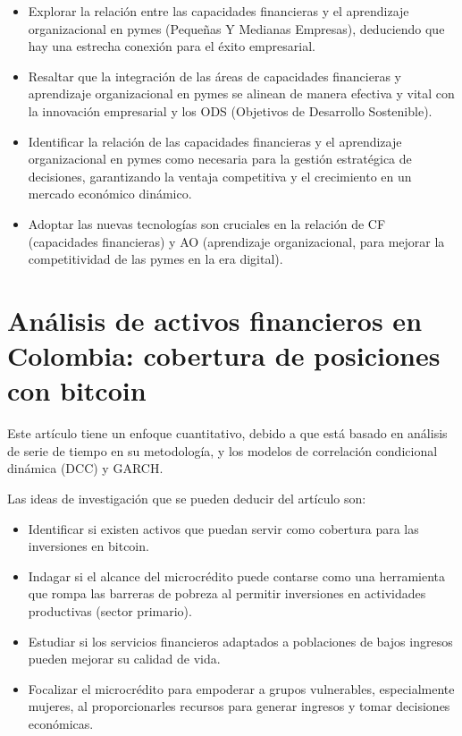 \documentclass[letterpaper, 12pt]{report}
\begin{document}
\begin{itemize}
      \item Explorar la relación entre las capacidades financieras y el aprendizaje
            organizacional en pymes (Pequeñas Y Medianas Empresas), deduciendo que hay una
            estrecha conexión para el éxito empresarial.

      \item Resaltar que la integración de las áreas de capacidades financieras y
            aprendizaje organizacional en pymes se alinean de manera efectiva y vital con
            la innovación empresarial y los ODS (Objetivos de Desarrollo Sostenible).

      \item Identificar la relación de las capacidades financieras y el aprendizaje
            organizacional en pymes como necesaria para la gestión estratégica de
            decisiones, garantizando la ventaja competitiva y el crecimiento en un mercado
            económico dinámico.

      \item Adoptar las nuevas tecnologías son cruciales en la relación de CF (capacidades
            financieras) y AO (aprendizaje organizacional, para mejorar la competitividad
            de las pymes en la era digital).
\end{itemize}

\section*{Análisis de activos financieros en Colombia: cobertura de posiciones con bitcoin}

Este artículo tiene un enfoque cuantitativo, debido a que está basado en
análisis de serie de tiempo en su metodología, y los modelos de correlación
condicional dinámica (DCC) y GARCH\@{}.

Las ideas de investigación que se pueden deducir del artículo son:

\begin{itemize}
      \item Identificar si existen activos que puedan servir como cobertura para las
            inversiones en bitcoin.

      \item Indagar si el alcance del microcrédito puede contarse como una herramienta que
            rompa las barreras de pobreza al permitir inversiones en actividades
            productivas (sector primario).

      \item Estudiar si los servicios financieros adaptados a poblaciones de bajos ingresos
            pueden mejorar su calidad de vida.

      \item Focalizar el microcrédito para empoderar a grupos vulnerables, especialmente
            mujeres, al proporcionarles recursos para generar ingresos y tomar decisiones
            económicas.

\end{itemize}

\printbibliography
\end{document}
